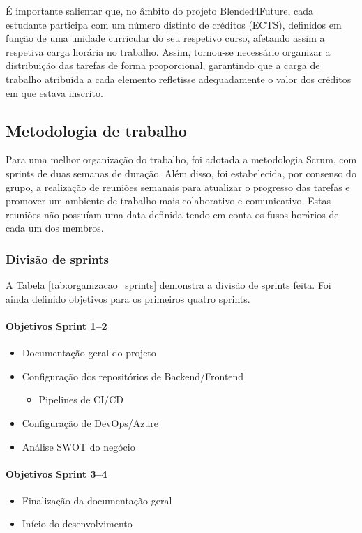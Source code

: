 É importante salientar que, no âmbito do projeto Blended4Future, cada estudante participa com um número distinto de créditos (ECTS), definidos em função de uma unidade curricular do seu respetivo curso, afetando assim a respetiva carga horária no trabalho. Assim, tornou-se necessário organizar a distribuição das tarefas de forma proporcional, garantindo que a carga de trabalho atribuída a cada elemento refletisse adequadamente o valor dos créditos em que estava inscrito.

\subsection{Metodologia de trabalho}

Para uma melhor organização do trabalho, foi adotada a metodologia Scrum, com sprints de duas semanas de duração. Além disso, foi estabelecida, por consenso do grupo, a realização de reuniões semanais para atualizar o progresso das tarefas e promover um ambiente de trabalho mais colaborativo e comunicativo. Estas reuniões não possuíam uma data definida tendo em conta os fusos horários de cada um dos membros.

\subsubsection{Divisão de sprints}

A Tabela \ref{tab:organizacao_sprints} demonstra a divisão de sprints feita. Foi ainda definido objetivos para os primeiros quatro sprints.

\paragraph*{Objetivos Sprint 1–2}
\begin{itemize}[nosep,leftmargin=*]
  \item Documentação geral do projeto
  \item Configuração dos repositórios de Backend/Frontend
    \begin{itemize}[nosep,leftmargin=*]
      \item Pipelines de CI/CD
    \end{itemize}
  \item Configuração de DevOps/Azure
  \item Análise SWOT do negócio
\end{itemize}

\paragraph*{Objetivos Sprint 3–4}
\begin{itemize}[nosep,leftmargin=*]
  \item Finalização da documentação geral
  \item Início do desenvolvimento
\end{itemize}


